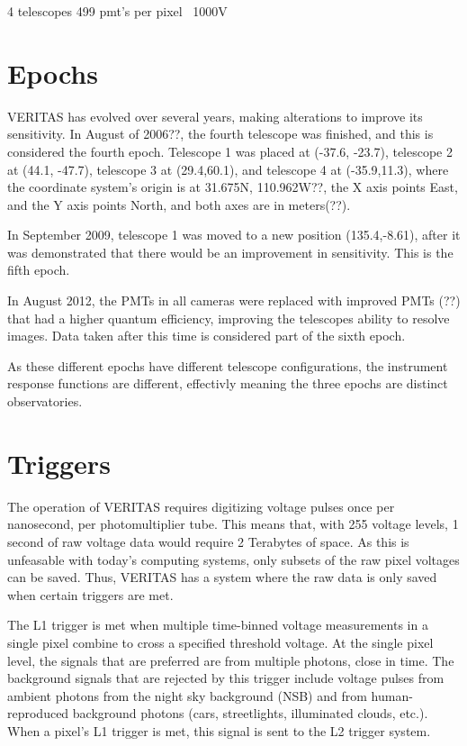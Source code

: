 4 telescopes
499 pmt's per pixel
~1000V

\section{Epochs}\label{sec:epochs}
VERITAS has evolved over several years, making alterations to improve its sensitivity.
In August of 2006??, the fourth telescope was finished, and this is considered the fourth epoch.
Telescope 1 was placed at (-37.6, -23.7), telescope 2 at (44.1, -47.7), telescope 3 at (29.4,60.1), and telescope 4 at (-35.9,11.3), where the coordinate system's origin is at 31.675N, 110.962W??, the X axis points East, and the Y axis points North, and both axes are in meters(??).

In September 2009, telescope 1 was moved to a new position (135.4,-8.61), after it was demonstrated that there would be an improvement in sensitivity.
This is the fifth epoch.

In August 2012, the PMTs in all cameras were replaced with improved PMTs (??) that had a higher quantum efficiency, improving the telescopes ability to resolve images.
Data taken after this time is considered part of the sixth epoch.

As these different epochs have different telescope configurations, the instrument response functions are different, effectivly meaning the three epochs are distinct observatories.


\section{Triggers}\label{sec:trig}

The operation of VERITAS requires digitizing voltage pulses once per nanosecond, per photomultiplier tube.
This means that, with 255 voltage levels, 1 second of raw voltage data would require 2 Terabytes of space.
As this is unfeasable with today's computing systems, only subsets of the raw pixel voltages can be saved.
Thus, VERITAS has a system where the raw data is only saved when certain triggers are met.

The L1 trigger is met when multiple time-binned voltage measurements in a single pixel combine to cross a specified threshold voltage.
At the single pixel level, the signals that are preferred are from multiple photons, close in time.
The background signals that are rejected by this trigger include voltage pulses from ambient photons from the night sky background (NSB) and from human-reproduced background photons (cars, streetlights, illuminated clouds, etc.).
When a pixel's L1 trigger is met, this signal is sent to the L2 trigger system.

